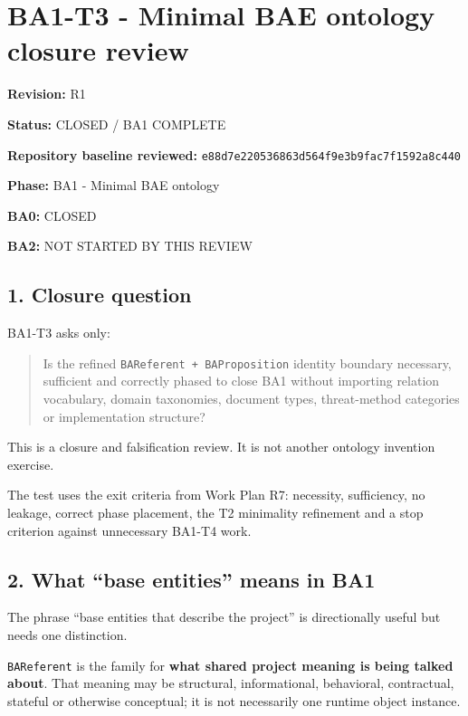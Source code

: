 \documentclass[
  10pt,
  a4paper,
]{article}
\author{}
\date{}
\begin{document}
\section{BA1-T3 - Minimal BAE ontology closure
review}\label{ba1-t3---minimal-bae-ontology-closure-review}

\textbf{Revision:} R1

\textbf{Status:} CLOSED / BA1 COMPLETE

\textbf{Repository baseline reviewed:}
\texttt{e88d7e220536863d564f9e3b9fac7f1592a8c440}

\textbf{Phase:} BA1 - Minimal BAE ontology

\textbf{BA0:} CLOSED

\textbf{BA2:} NOT STARTED BY THIS REVIEW

\subsection{1. Closure question}\label{closure-question}

BA1-T3 asks only:

\begin{quote}
Is the refined \texttt{BAReferent\ +\ BAProposition} identity boundary
necessary, sufficient and correctly phased to close BA1 without
importing relation vocabulary, domain taxonomies, document types,
threat-method categories or implementation structure?
\end{quote}

This is a closure and falsification review. It is not another ontology
invention exercise.

The test uses the exit criteria from Work Plan R7: necessity,
sufficiency, no leakage, correct phase placement, the T2 minimality
refinement and a stop criterion against unnecessary BA1-T4 work.

\subsection{2. What ``base entities'' means in
BA1}\label{what-base-entities-means-in-ba1}

The phrase ``base entities that describe the project'' is directionally
useful but needs one distinction.

\texttt{BAReferent} is the family for \textbf{what shared project
meaning is being talked about}. That meaning may be structural,
informational, behavioral, contractual, stateful or otherwise
conceptual; it is not necessarily one runtime object instance.
\end{document}
